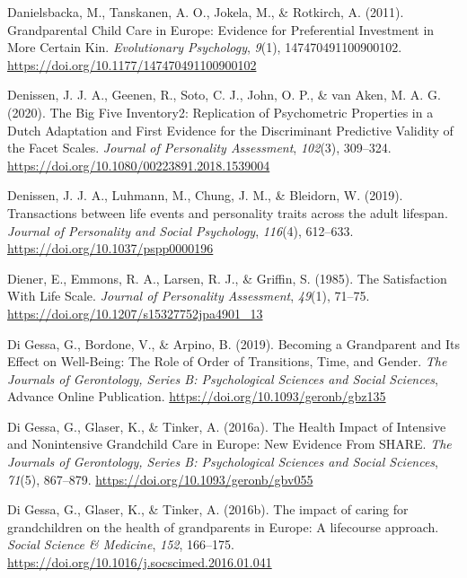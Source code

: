 \documentclass[
  english,
  man,floatsintext]{apa7}
\begin{document}
\leavevmode\hypertarget{ref-danielsbackaGrandparentalChildCare2011}{}%
Danielsbacka, M., Tanskanen, A. O., Jokela, M., \& Rotkirch, A. (2011). Grandparental Child Care in Europe: Evidence for Preferential Investment in More Certain Kin. \emph{Evolutionary Psychology}, \emph{9}(1), 147470491100900102. \url{https://doi.org/10.1177/147470491100900102}

\leavevmode\hypertarget{ref-denissenBigFiveInventory2020}{}%
Denissen, J. J. A., Geenen, R., Soto, C. J., John, O. P., \& van Aken, M. A. G. (2020). The Big Five Inventory2: Replication of Psychometric Properties in a Dutch Adaptation and First Evidence for the Discriminant Predictive Validity of the Facet Scales. \emph{Journal of Personality Assessment}, \emph{102}(3), 309--324. \url{https://doi.org/10.1080/00223891.2018.1539004}

\leavevmode\hypertarget{ref-denissenTransactionsLifeEvents2019}{}%
Denissen, J. J. A., Luhmann, M., Chung, J. M., \& Bleidorn, W. (2019). Transactions between life events and personality traits across the adult lifespan. \emph{Journal of Personality and Social Psychology}, \emph{116}(4), 612--633. \url{https://doi.org/10.1037/pspp0000196}

\leavevmode\hypertarget{ref-dienerSatisfactionLifeScale1985}{}%
Diener, E., Emmons, R. A., Larsen, R. J., \& Griffin, S. (1985). The Satisfaction With Life Scale. \emph{Journal of Personality Assessment}, \emph{49}(1), 71--75. \url{https://doi.org/10.1207/s15327752jpa4901_13}

\leavevmode\hypertarget{ref-digessaBecomingGrandparentIts2019}{}%
Di Gessa, G., Bordone, V., \& Arpino, B. (2019). Becoming a Grandparent and Its Effect on Well-Being: The Role of Order of Transitions, Time, and Gender. \emph{The Journals of Gerontology, Series B: Psychological Sciences and Social Sciences}, Advance Online Publication. \url{https://doi.org/10.1093/geronb/gbz135}

\leavevmode\hypertarget{ref-digessaHealthImpactIntensive2016}{}%
Di Gessa, G., Glaser, K., \& Tinker, A. (2016a). The Health Impact of Intensive and Nonintensive Grandchild Care in Europe: New Evidence From SHARE. \emph{The Journals of Gerontology, Series B: Psychological Sciences and Social Sciences}, \emph{71}(5), 867--879. \url{https://doi.org/10.1093/geronb/gbv055}

\leavevmode\hypertarget{ref-digessaImpactCaringGrandchildren2016}{}%
Di Gessa, G., Glaser, K., \& Tinker, A. (2016b). The impact of caring for grandchildren on the health of grandparents in Europe: A lifecourse approach. \emph{Social Science \& Medicine}, \emph{152}, 166--175. \url{https://doi.org/10.1016/j.socscimed.2016.01.041}
\end{document}
